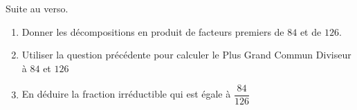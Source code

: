 
\vspace{5mm}
\hfill {\footnotesize Suite au verso.}
\newpage

\exo

\begin{enumerate}

\item Donner les décompositions en produit de facteurs premiers de $84$ et de $126$.

\item Utiliser la question précédente pour calculer le Plus Grand Commun Diviseur à $84$ et $126$

\item En déduire la fraction irréductible qui est égale à $\dfrac{84}{126}$ 

\end{enumerate}

